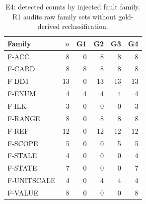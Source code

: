 \begin{table}[t]
\centering\footnotesize
\caption{E4: detected counts by injected fault family. R1 audits raw family sets without gold-derived reclassification.}
\label{tab:archive-families}
\setlength{\tabcolsep}{3.5pt}
\begin{tabular}{@{}lrrrrr@{}}
\toprule
Family & $n$ & G1 & G2 & G3 & G4 \\
\midrule
F-ACC & 8 & 0 & 8 & 8 & 8 \\
F-CARD & 8 & 8 & 8 & 8 & 8 \\
F-DIM & 13 & 0 & 13 & 13 & 13 \\
F-ENUM & 4 & 4 & 4 & 4 & 4 \\
F-ILK & 3 & 0 & 0 & 0 & 3 \\
F-RANGE & 8 & 0 & 8 & 8 & 8 \\
F-REF & 12 & 0 & 12 & 12 & 12 \\
F-SCOPE & 5 & 0 & 0 & 5 & 5 \\
F-STALE & 4 & 0 & 0 & 0 & 4 \\
F-STATE & 7 & 0 & 0 & 0 & 7 \\
F-UNITSCALE & 4 & 0 & 4 & 4 & 4 \\
F-VALUE & 8 & 0 & 0 & 0 & 8 \\
\bottomrule
\end{tabular}
\end{table}
